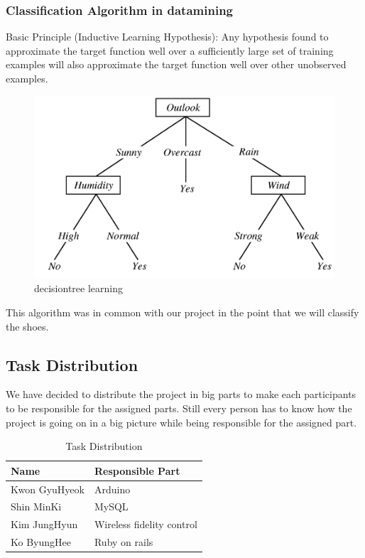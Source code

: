 \documentclass[conference]{IEEEtran}
\begin{document}
\subsubsection{Classification Algorithm in datamining}
Basic Principle (Inductive Learning Hypothesis): Any hypothesis found to approximate the target function well over a sufficiently large set of training examples will also approximate the target function well over other unobserved examples.
\begin{figure}[htbp]
\begin{center}
    \includegraphics[scale=0.5]{decisiontree_learning}
    \caption{decisiontree learning} \label{fig:label}
\end{center}
\end{figure}

This algorithm was in common with our project in the point that we will classify the shoes. 


\subsection{Task Distribution}
We have decided to distribute the project in big parts to make each participants to be responsible for the assigned parts. Still every person has to know how the project is going on in a big picture while being responsible for the assigned part.
\begin{table}[!t]
\renewcommand{\arrayrulewidth}{1pt}
\renewcommand{\arraystretch}{2.5}
\begin{tabular}
{|p{4cm}|p{4cm}|}\hline
Name & Responsible Part\\ \hline
Kwon GyuHyeok&Arduino\\ \hline
Shin MinKi&MySQL\\ \hline
Kim JungHyun&Wireless fidelity control\\ \hline
Ko ByungHee&Ruby on rails\\ \hline
\end{tabular}
\\
\\
\caption{Task Distribution}
\label{tab:template}
\end{table}
\\
\\
\\
\\
\\
\\
\\
\end{document}

